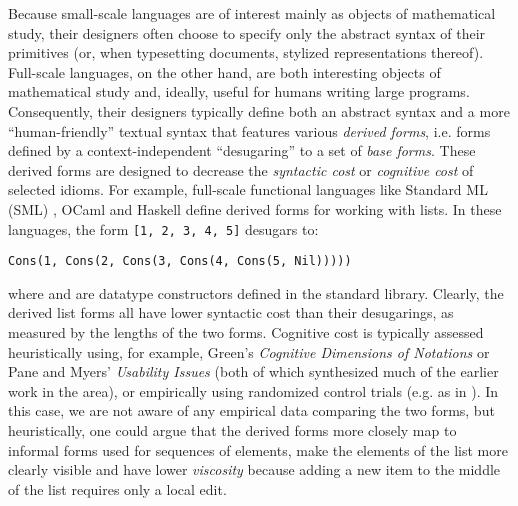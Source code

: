 Because small-scale languages are of interest mainly as objects of mathematical study, their designers often choose to specify only the abstract syntax of their primitives (or, when typesetting documents, stylized representations thereof). Full-scale languages, on the other hand, are both interesting objects of mathematical study and, ideally, useful for humans writing large programs. Consequently, their designers  typically define both an abstract syntax and a more ``human-friendly'' textual syntax that features various \emph{derived forms}, i.e. forms defined by a context-independent ``desugaring'' to a set of \emph{base forms}. These derived forms are designed to decrease the \emph{syntactic cost} or \emph{cognitive cost} of selected idioms. 
For example, full-scale functional languages like Standard ML (SML) \cite{mthm97-for-dart,harper1997programming}, OCaml \cite{ocaml-manual} and Haskell \cite{jones2003haskell} %
define derived forms for working with lists. In these languages, the form \lstinline{[1, 2, 3, 4, 5]} desugars to: 
\begin{lstlisting}[numbers=none]
Cons(1, Cons(2, Cons(3, Cons(4, Cons(5, Nil)))))
\end{lstlisting}
where  and  are datatype constructors defined in the standard library. Clearly, the derived list forms all have lower syntactic cost than their desugarings, as measured by the lengths of the two forms. Cognitive cost is typically assessed heuristically using, for example, Green's \emph{Cognitive Dimensions of Notations} \cite{Green89,green1996usability} or Pane and Myers' \emph{Usability Issues} \cite{pane1996usability} (both of which synthesized much of the earlier work in the area), or empirically using randomized control trials (e.g. as in \cite{journals/jeric/StefikS13}). In this case, we are not aware of any empirical data comparing the two forms, but heuristically, one could argue that the derived forms more closely map to informal forms used for sequences of elements, make the elements of the list more clearly visible and have lower \emph{viscosity} because adding a new item to the middle of the list requires only a local edit. 

